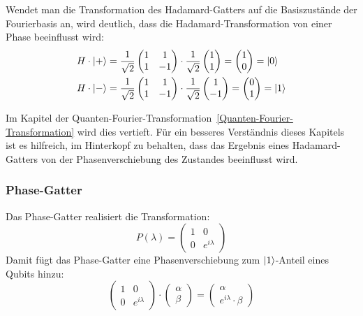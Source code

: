 Wendet man die Transformation des Hadamard-Gatters auf die Basiszustände der Fourierbasis an, 
wird deutlich,
dass die Hadamard-Transformation von einer Phase beeinflusst wird:
\begin{align*}
  H \cdot \ket{+} &=
  \frac{1}{\sqrt{2}}
  \begin{pmatrix}
    1 & 1 \\
    1 & -1
  \end{pmatrix}
  \cdot
  \frac{1}{\sqrt{2}}
  \begin{pmatrix}
    1 \\
    1
  \end{pmatrix}
  =
  \begin{pmatrix}
    1 \\
    0
  \end{pmatrix}
  =
  \ket{0}\\
  H \cdot \ket{-} &=
  \frac{1}{\sqrt{2}}
  \begin{pmatrix}
    1 & 1 \\
    1 & -1
  \end{pmatrix}
  \cdot
  \frac{1}{\sqrt{2}}
  \begin{pmatrix}
    1 \\
    -1
  \end{pmatrix}
  =
  \begin{pmatrix}
    0 \\
    1
  \end{pmatrix}
  =
  \ket{1}
\end{align*}


    Im Kapitel der Quanten-Fourier-Transformation~\ref{Quanten-Fourier-Transformation} wird dies vertieft.
    Für ein besseres Verständnis dieses Kapitels ist es hilfreich, 
    im Hinterkopf zu behalten, 
    dass das Ergebnis eines Hadamard-Gatters von der Phasenverschiebung des Zustandes beeinflusst wird.


    \subsubsection*{Phase-Gatter}
    Das Phase-Gatter realisiert die Transformation:
    \[
      P(\lambda) =
      \begin{pmatrix}
        1 & 0 \\
        0 & e^{i\lambda}
        \end{pmatrix}
      \]
    Damit fügt das Phase-Gatter eine Phasenverschiebung zum \(\ket{1}\)-Anteil eines Qubits hinzu:
    \[
      \begin{pmatrix}
        1 & 0 \\
        0 & e^{i\lambda}
        \end{pmatrix}
        \cdot
        \begin{pmatrix}
          \alpha \\
          \beta
        \end{pmatrix}
          =
        \begin{pmatrix}
          \alpha \\
          e^{i\lambda} \cdot \beta
        \end{pmatrix}
    \]


